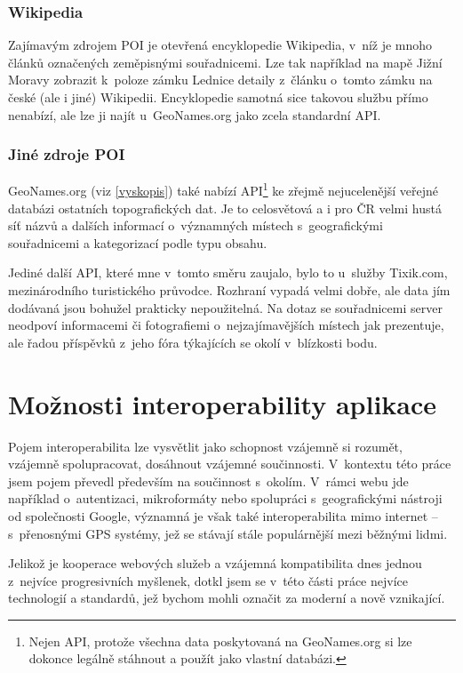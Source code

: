 \subsection{Wikipedia}
Zajímavým zdrojem POI je otevřená encyklopedie Wikipedia, v~níž je
mnoho článků označených zeměpisnými souřadnicemi. Lze tak například
na mapě Jižní Moravy zobrazit k~poloze zámku Lednice detaily z~článku
o~tomto zámku na české (ale i jiné) Wikipedii. Encyklopedie samotná
sice takovou službu přímo nenabízí, ale lze ji najít u~GeoNames.org
jako zcela standardní API.

\subsection{Jiné zdroje POI}
GeoNames.org (viz \ref{vyskopis}) také nabízí API\footnote{Nejen API,
protože všechna data poskytovaná na GeoNames.org si lze dokonce legálně stáhnout a použít
jako vlastní databázi.} ke zřejmě nej\-ucelenější veřejné databázi
ostatních topografických dat. Je to celosvětová a i pro ČR velmi
hustá síť názvů a dalších informací o~významných místech
s~geografickými souřadnicemi a kategorizací podle typu obsahu.

Jediné další API, které mne v~tomto směru zaujalo, bylo to u~služby
Tixik.com, mezinárodního turistického průvodce. Rozhraní vypadá velmi
dobře, ale data jím dodávaná jsou bohužel prakticky nepoužitelná. Na
dotaz se souřadnicemi server neodpoví
informacemi či fotografiemi o~nej\-zajímavějších místech jak
prezentuje, ale řadou příspěvků z~jeho fóra týkajících se okolí
v~blízkosti bodu.

\chapter{Možnosti interoperability aplikace}
Pojem interoperabilita lze vysvětlit jako schopnost vzájemně si
rozumět, vzájemně spolupracovat, dosáhnout vzájemné součinnosti.
V~kontextu této práce jsem pojem převedl především na součinnost
s~okolím. V~rámci webu jde například o~autentizaci, mikroformáty nebo
spolupráci s~geografickými nástroji od společnosti Google, významná je
však také interoperabilita mimo internet -- s~přenosnými GPS systémy,
jež se stávají stále populárnější mezi běžnými lidmi.

Jelikož je kooperace webových služeb a vzájemná kompatibilita dnes
jednou z~nejvíce progresivních myšlenek, dotkl jsem se v~této části
práce nejvíce technologií a standardů, jež bychom mohli označit za
moderní a nově vznikající.

